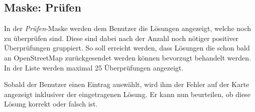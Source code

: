 \subsection{Maske: Prüfen}
In der \emph{Prüfen}-Maske werden dem Benutzer die Lösungen angezeigt, welche noch zu überprüfen sind.
Diese sind dabei nach der Anzahl noch nötiger positiver Überprüfungen gruppiert.
So soll erreicht werden, dass Lösungen die schon bald an \gls{OpenStreetMap} zurückgesendet werden können bevorzugt behandelt werden.
In der Liste werden maximal 25 Überprüfungen angezeigt.

Sobald der Benutzer einen Eintrag auswählt, wird ihm der Fehler auf der Karte angezeigt inklusiver der eingetragenen Lösung.
Er kann nun beurteilen, ob diese Lösung korrekt oder falsch ist.

\begin{figure}[H]
\hfill
{}

\end{figure}
